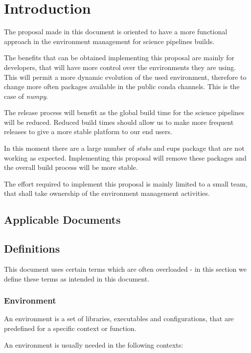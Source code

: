 \section{Introduction} \label{sec:intro}

The proposal made in this document is oriented to have a more functional approach in the environment management for science pipelines builds.

The benefits that can be obtained implementing this proposal are mainly for developers, that will have more control over the environments they are using. 
This will permit a more dynamic evolution of the used environment, therefore to change more often packages available in the public conda channels. This is the case of \textit{numpy}.

The release process will  benefit as the global build time for the science pipelines  will be reduced. 
Reduced build times should allow us to make more frequent releases to give a more stable platform to our end users.

In this moment there are a large number of \textit{stubs} and eups package that are not working as expected.
Implementing this proposal will remove these packages and the overall build process will be more stable.

The effort required to implement this proposal is mainly limited to a small team, that shall take ownership of the environment management activities.


\subsection{Applicable Documents}


\subsection{Definitions}

This document uses certain terms which are often overloaded -  in this section we define these terms  as intended in this document.

\subsubsection{Environment} \label{sec:envdef}

An environment is a set of libraries, executables and configurations, that are predefined for a specific context or function.

An environment is usually needed in the following contexts:


